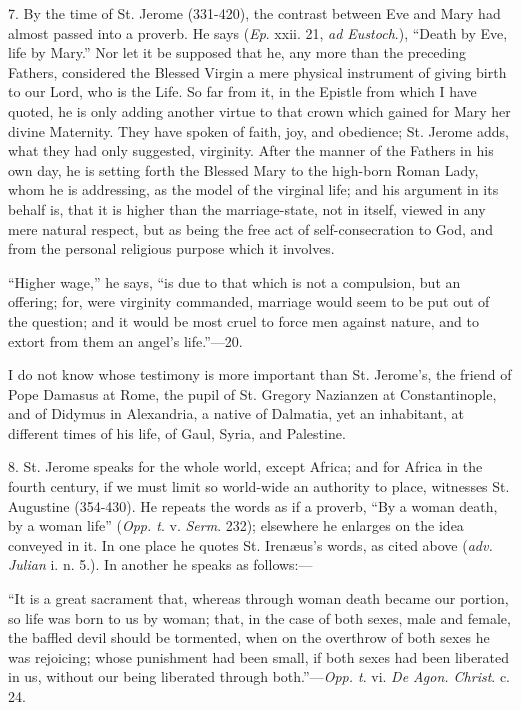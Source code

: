 7. By the time of St. Jerome (331-420), the contrast between Eve and
Mary had almost passed into a proverb. He says (\emph{Ep}. xxii. 21, \emph{ad
Eustoch}.), ``Death by Eve, life by Mary.'' Nor let it be
supposed that he, any more than the preceding Fathers, considered the
Blessed Virgin a mere physical instrument of giving birth to our Lord,
who is the Life. So far from it, in the Epistle from which I have
quoted, he is only adding another virtue to that crown which gained for
Mary her divine Maternity. They have spoken of faith, joy, and
obedience; St. Jerome adds, what they had only suggested, virginity.
After the manner of the Fathers in his own day, he is setting forth the
Blessed Mary to the high-born Roman Lady, whom he is addressing, as the
model of the virginal life; and his argument in its behalf is, that it
is higher than the marriage-state, not in itself, viewed in any mere
natural respect, but as being the free act of self-consecration to God,
and from the personal religious purpose which it involves.

``Higher wage,'' he says, ``is due to that which is not a
compulsion, but an offering; for, were virginity commanded, marriage
would seem to be put out of the question; and it would be most cruel to
force men against nature, and to extort from them an angel's life.''—20.

I do not know whose testimony is more important than St. Jerome's,
the friend of Pope Damasus at Rome, the pupil of St. Gregory Nazianzen
at Constantinople, and of Didymus in Alexandria, a native of Dalmatia,
yet an inhabitant, at different times of his life, of Gaul, Syria,
and Palestine.

8. St. Jerome speaks for the whole world, except Africa; and for
Africa in the fourth century, if we must limit so world-wide an
authority to place, witnesses St. Augustine (354-430). He repeats the
words as if a proverb, ``By a woman death, by a woman life'' (\emph{Opp.
t}. v. \emph{Serm}. 232); elsewhere he enlarges on the idea conveyed
in it. In one place he quotes St. Irenæus's words, as cited above (\emph{adv.
Julian} i. n. 5.). In another he speaks as follows:—

``It is a great sacrament that, whereas through woman death
became our portion, so life was born to us by woman; that, in the case
of both sexes, male and female, the baffled devil should be tormented,
when on the overthrow of both sexes he was rejoicing; whose punishment
had been small, if both sexes had been liberated in us, without our
being liberated through both.''—\emph{Opp. t}. vi. \emph{De Agon.
Christ}. c. 24.

